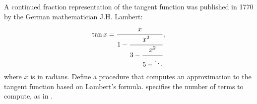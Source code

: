 \begin{exercise}
	\label{Exercise 1.39}
	A continued fraction  representation of the tangent function was published in 1770 by the German mathematician J.H. Lambert:
	\[
		\tan x = \cfrac{x}{1 - \cfrac{x^2}{3 - \cfrac{x^2}{5 - \ddots}}}\,,
	\]
	where \( x \) is in radians.
	Define a procedure  that computes an approximation to the tangent function based on Lambert’s formula.
	 specifies the number of terms to compute, as in .
\end{exercise}
